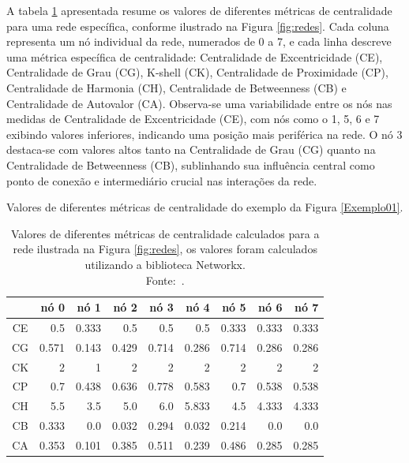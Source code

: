 A tabela \ref{tab:centralidade_rede} apresentada resume os valores de diferentes métricas de centralidade para uma rede específica, conforme ilustrado na Figura \ref{fig:redes}. Cada coluna representa um nó individual da rede, numerados de 0 a 7, e cada linha descreve uma métrica específica de centralidade: Centralidade de Excentricidade (CE), Centralidade de Grau (CG), K-shell (CK), Centralidade de Proximidade (CP), Centralidade de Harmonia (CH), Centralidade de Betweenness (CB) e Centralidade de Autovalor (CA). Observa-se uma variabilidade entre os nós nas medidas de Centralidade de Excentricidade (CE), com nós como o 1, 5, 6 e 7 exibindo valores inferiores, indicando uma posição mais periférica na rede. O nó 3 destaca-se com valores altos tanto na Centralidade de Grau (CG) quanto na Centralidade de Betweenness (CB), sublinhando sua influência central como ponto de conexão e intermediário crucial nas interações da rede.
\begin{table}[H]
    \captionsetup{width=13.5cm}
    \caption{Valores de diferentes métricas de centralidade do exemplo da Figura \ref{Exemplo01}.}
    \centering
    \begin{tabular}{crrrrrrrr}
        \toprule
        & nó 0 & nó 1 & nó 2 & nó 3 & nó 4 & nó 5 & nó 6 & nó 7 \\
        \midrule
        \midrule
        CE & 0.5 & 0.333 & 0.5 & 0.5 & 0.5 & 0.333 & 0.333 & 0.333 \\
        CG & 0.571 & 0.143 & 0.429 & 0.714 & 0.286 & 0.714 & 0.286 & 0.286 \\
        CK & 2 & 1 & 2 & 2 & 2 & 2 & 2 & 2 \\
        CP & 0.7 & 0.438 & 0.636 & 0.778 & 0.583 & 0.7 & 0.538 & 0.538 \\
        CH & 5.5 & 3.5 & 5.0 & 6.0 & 5.833 & 4.5 & 4.333 & 4.333 \\
        CB & 0.333 & 0.0 & 0.032 & 0.294 & 0.032 & 0.214 & 0.0 & 0.0 \\
        CA & 0.353 & 0.101 & 0.385 & 0.511 & 0.239 & 0.486 & 0.285 & 0.285 \\
        \bottomrule
    \end{tabular}
    \caption*{Valores de diferentes métricas de centralidade calculados para a rede ilustrada na Figura \ref{fig:redes}, os valores foram calculados utilizando a biblioteca Networkx.\\ Fonte:~\cite{hagberg2008exploring}.}
    \label{tab:centralidade_rede}
\end{table}

